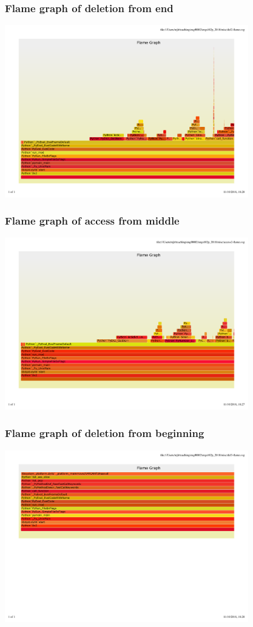 \documentclass{beamer} %
\begin{document}
\begin{frame}
  \frametitle{Flame graph of deletion from end}
  \centering
  \includegraphics[height=75mm]{assets/del2-flame.pdf}
\end{frame}
  
\begin{frame}
  \frametitle{Flame graph of access from middle}
  \centering
  \includegraphics[height=75mm]{assets/access2-flame.pdf}
\end{frame}
  
\begin{frame}
  \frametitle{Flame graph of deletion from beginning}
  \centering
  \includegraphics[height=75mm]{assets/del3-flame.pdf}
\end{frame}
\end{document}
